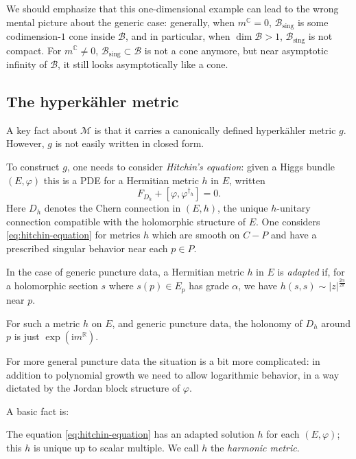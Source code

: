 \documentclass[12pt,letterpaper,reqno]{article}
\numberwithin{equation}{section}
\newcommand{\cB}{\ensuremath{\mathcal B}}
\newcommand{\cM}{\ensuremath{\mathcal M}}
\newcommand{\R}{\ensuremath{\mathbb R}}
\newcommand{\C}{\ensuremath{\mathbb C}}
\newcommand{\hk}{hyperk\"ahler\xspace}
\newcommand{\I}{{\mathrm i}}
\newcommand{\sing}{\mathrm{sing}}
\newcommand{\abs}[1]{\lvert#1\rvert}
\newcommand{\ti}[1]{\textit{#1}}
\newcommand{\fixme}[1]{{\color{orange}{[#1]}}}
\begin{document}
We should emphasize that this one-dimensional example can lead to the
wrong mental picture about the generic case: generally,
when $m^\C = 0$, $\cB_\sing$ is some codimension-$1$ cone inside $\cB$, and in particular,
when $\dim \cB > 1$, $\cB_\sing$ is not compact. For $m^\C \neq 0$, $\cB_\sing \subset \cB$
is not a cone anymore, but near asymptotic infinity of $\cB$,
it still looks asymptotically like a cone.



\subsection{The \hk metric}

A key fact about $\cM$ is that it carries a canonically
defined \hk metric $g$. However, $g$ is not easily
written in closed form.

To construct $g$, one needs to consider \ti{Hitchin's equation}:
given a Higgs bundle $(E,\varphi)$ this is a PDE
for a Hermitian metric $h$ in $E$, written
\begin{equation} \label{eq:hitchin-equation}
  F_{D_h} + [\varphi, \varphi^{\dagger_h}] = 0.
\end{equation}
Here $D_h$ denotes the Chern connection in $(E,h)$,
the unique $h$-unitary connection compatible with
the holomorphic structure of $E$.
\fixme{write local coordinates?}
One considers \eqref{eq:hitchin-equation} for
metrics $h$ which are smooth on $C - P$ and
have a prescribed singular behavior near each
$p \in P$.
\begin{defn} 
In the case of generic puncture data, a Hermitian metric $h$
in $E$ is \ti{adapted} if, for a holomorphic section $s$ 
where $s(p) \in E_p$ has grade $\alpha$, we have
$h(s,s) \sim \abs{z}^{\frac{2 \alpha}{2\pi}}$ near $p$.
\end{defn}
For such a metric $h$ on $E$, and generic puncture data, 
the holonomy of $D_h$ around $p$
is just $\exp(\I m^\R)$.

For more general puncture data the situation is a bit 
more complicated: in addition to polynomial growth
we need to allow logarithmic behavior, in a way dictated
by the Jordan block structure of $\varphi$. \fixme{cite Simpson}

A basic fact is: \fixme{refs: Simpson}
\begin{thm} \label{thm:hitchin-existence}
The equation \eqref{eq:hitchin-equation} has an
adapted solution $h$ for each $(E,\varphi)$;
this $h$ is unique up to scalar multiple.
We call $h$ the \ti{harmonic metric}.
\end{thm}
\end{document}
